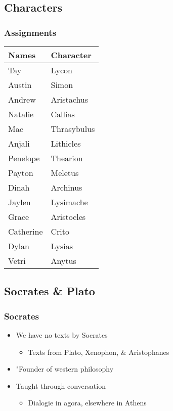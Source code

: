 \documentclass[11pt]{article}
\begin{document}
\subsection{Characters}
\label{sec:orgf11dc3c}
\subsubsection{Assignments}
\label{sec:org7dd4527}
\begin{center}
\begin{tabular}{ll}
Names & Character\\
\hline
Tay & Lycon\\
Austin & Simon\\
Andrew & Aristachus\\
Natalie & Callias\\
Mac & Thrasybulus\\
Anjali & Lithicles\\
Penelope & Thearion\\
Payton & Meletus\\
Dinah & Archinus\\
Jaylen & Lysimache\\
Grace & Aristocles\\
Catherine & Crito\\
Dylan & Lysias\\
Vetri & Anytus\\
\end{tabular}
\end{center}

\subsection{Socrates \& Plato}
\label{sec:org9c8fd55}
\subsubsection{Socrates}
\label{sec:orgc195d65}
\begin{itemize}
\item We have no texts by Socrates
\begin{itemize}
\item Texts from Plato, Xenophon, \& Aristophanes
\end{itemize}
\item "Founder of western philosophy
\item Taught through conversation
\begin{itemize}
\item Dialogie in agora, elsewhere in Athens
\end{itemize}
\end{itemize}
\end{document}
